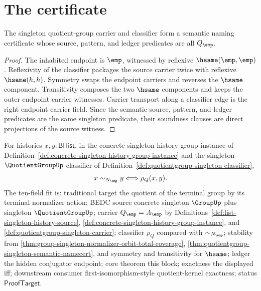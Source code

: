 \section{The certificate}
\label{sec:quotientgroup-certificate}

\begin{theorem}
\label{thm:quotientgroup-singleton-semantic-namecert}
The singleton quotient-group carrier and classifier form a semantic naming
certificate whose source, pattern, and ledger predicates are all
$Q_{\emp}$.
\end{theorem}
\begin{proof}
The inhabited endpoint is $\emp$, witnessed by reflexive
$\hsame(\emp,\emp)$. Reflexivity of the classifier packages the source carrier
twice with reflexive $\hsame(h,h)$. Symmetry swaps the endpoint carriers and
reverses the $\hsame$ component. Transitivity composes the two $\hsame$
components and keeps the outer endpoint carrier witnesses. Carrier transport
along a classifier edge is the right endpoint carrier field. Since the semantic
source, pattern, and ledger predicates are the same singleton predicate, their
soundness clauses are direct projections of the source witness.
\end{proof}
\begin{theorem}
\label{thm:quotientgroup-singleton-normalizer-orbit-classifier-collapse}
For histories $x,y:\mathsf{BHist}$, in the concrete singleton history group
instance of
Definition~\ref{def:concrete-singleton-history-group-instance} and the
singleton $\QuotientGroupUp$ classifier of
Definition~\ref{def:quotientgroup-singleton-classifier},
$$
x\sim_{N_{\emp}}y \Longleftrightarrow \rho_Q(x,y).
$$
The ten-field fit is: traditional target the quotient of the terminal group by
its terminal normalizer action; BEDC source concrete singleton $\GroupUp$ plus
singleton $\QuotientGroupUp$; carrier $Q_{\emp}=A_{\emp}$ by
Definitions~\ref{def:list-singleton-history-source},
\ref{def:concrete-singleton-history-group-instance}, and
\ref{def:quotientgroup-singleton-carrier}; classifier $\rho_Q$ compared with
$\sim_{N_{\emp}}$; stability from
\autoref{thm:group-singleton-normalizer-orbit-total-coverage},
\autoref{thm:quotientgroup-singleton-semantic-namecert}, and symmetry and
transitivity for $\hsame$; ledger the hidden conjugator endpoint; core theorem
this block; exactness the displayed iff; downstream consumer
first-isomorphism-style quotient-kernel exactness; status
$\mathsf{ProofTarget}$.
\end{theorem}
